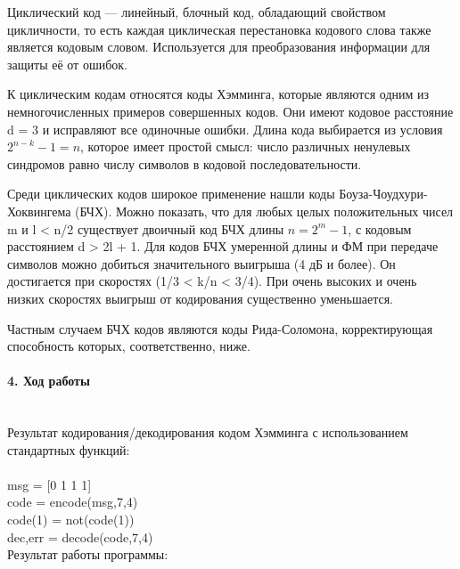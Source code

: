 \documentclass[12pt,a4paper]{report}
\begin{document}
Циклический код — линейный, блочный код, обладающий свойством цикличности, то есть каждая циклическая перестановка кодового слова также является кодовым словом. Используется для преобразования информации для защиты её от ошибок.

К циклическим кодам относятся коды Хэмминга, которые являются одним из немногочисленных примеров совершенных кодов. Они имеют кодовое расстояние d = 3 и исправляют все одиночные ошибки. Длина кода выбирается из условия $2^{n-k} - 1	= n$, которое имеет простой смысл: число различных ненулевых синдромов равно числу символов в кодовой последовательности. 

Среди циклических кодов широкое применение нашли коды Боуза-Чоудхури-Хоквингема (БЧХ). Можно показать, что для любых целых положительных чисел m и l < n/2 существует двоичный код БЧХ длины $n=2^m - 1$, с кодовым расстоянием d > 2l + 1. Для кодов БЧХ умеренной длины и ФМ при передаче символов можно добиться значительного выигрыша (4 дБ и более). Он достигается при скоростях (1/3 < k/n < 3/4). При очень высоких и очень низких скоростях выигрыш от кодирования существенно уменьшается.

Частным случаем БЧХ кодов являются коды Рида-Соломона, корректирующая способность которых, соответственно, ниже.

\paragraph{4. Ход работы \\\\}
Результат кодирования/декодирования кодом Хэмминга с использованием стандартных функций:\\\\
msg = [0 1 1 1]\\
code = encode(msg,7,4)\\
code(1) = not(code(1))\\
{dec,err} = decode(code,7,4)\\

Результат работы программы:
\begin{figure}[h!]
\end{figure}
\end{document}
